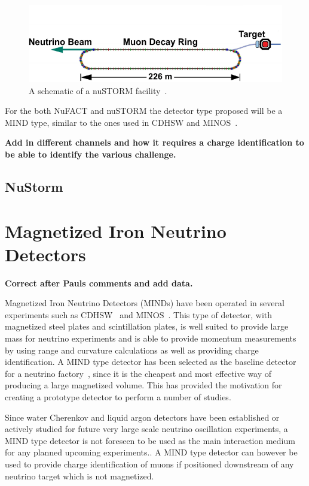\begin{figure}[h!]
\centering
\includegraphics[width=\textwidth]{figures/nuSTORM_schematic.pdf}
\caption{A schematic of a nuSTORM facility~\cite{Fix7}.}
\label{fig:nuStorm}
\end{figure}

For the both NuFACT and nuSTORM the detector type proposed will be a MIND type, similar to the ones used in CDHSW and MINOS~\cite{NuFACTIDS}.

\textbf{Add in different channels and how it requires a charge identification to be able to identify the various challenge.}



\subsection{NuStorm}

\section{Magnetized Iron Neutrino Detectors}\label{subsec:MINDdetector}
\textbf{Correct after Pauls comments and add data.}

Magnetized Iron Neutrino Detectors (MINDs) have been operated in several experiments such as CDHSW~\cite{40CDHSW} and MINOS~\cite{MINOS}. This type of detector, with magnetized steel plates and scintillation plates, is well suited to provide large mass for neutrino experiments and is able to provide momentum measurements by using range and curvature calculations as well as providing charge identification. A MIND type detector has been selected as the baseline detector for a neutrino factory~\cite{ISS, 27Bross}, since it is the cheapest and most effective way of producing a large magnetized volume. This has provided the motivation for creating a prototype detector to perform a number of studies.

Since water Cherenkov and liquid argon detectors have been established or actively studied for future very large scale neutrino oscillation experiments, a MIND type detector is not foreseen to be used as the main interaction medium for any planned upcoming experiments.. A MIND type detector can however be used to provide charge identification of muons if positioned downstream of any neutrino target which is not magnetized.


